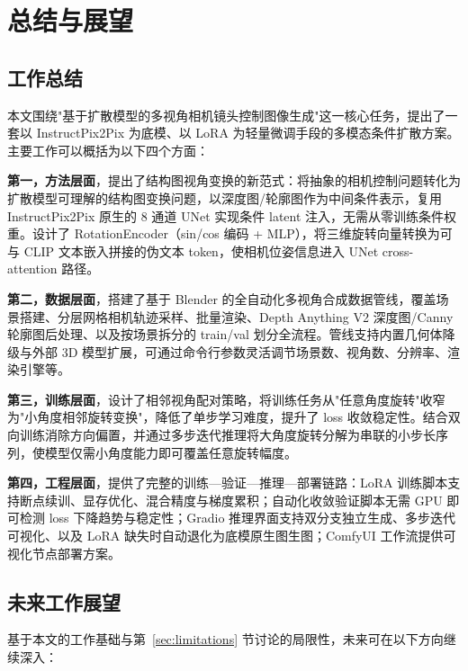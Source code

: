\chapter{总结与展望}

\section{工作总结}

本文围绕"基于扩散模型的多视角相机镜头控制图像生成"这一核心任务，提出了一套以 InstructPix2Pix 为底模、以 LoRA 为轻量微调手段的多模态条件扩散方案。主要工作可以概括为以下四个方面：

\textbf{第一，方法层面}，提出了结构图视角变换的新范式：将抽象的相机控制问题转化为扩散模型可理解的结构图变换问题，以深度图/轮廓图作为中间条件表示，复用 InstructPix2Pix 原生的 8 通道 UNet 实现条件 latent 注入，无需从零训练条件权重。设计了 RotationEncoder（sin/cos 编码 + MLP），将三维旋转向量转换为可与 CLIP 文本嵌入拼接的伪文本 token，使相机位姿信息进入 UNet cross-attention 路径。

\textbf{第二，数据层面}，搭建了基于 Blender 的全自动化多视角合成数据管线，覆盖场景搭建、分层网格相机轨迹采样、批量渲染、Depth Anything V2 深度图/Canny 轮廓图后处理、以及按场景拆分的 train/val 划分全流程。管线支持内置几何体降级与外部 3D 模型扩展，可通过命令行参数灵活调节场景数、视角数、分辨率、渲染引擎等。

\textbf{第三，训练层面}，设计了相邻视角配对策略，将训练任务从"任意角度旋转"收窄为"小角度相邻旋转变换"，降低了单步学习难度，提升了 loss 收敛稳定性。结合双向训练消除方向偏置，并通过多步迭代推理将大角度旋转分解为串联的小步长序列，使模型仅需小角度能力即可覆盖任意旋转幅度。

\textbf{第四，工程层面}，提供了完整的训练—验证—推理—部署链路：LoRA 训练脚本支持断点续训、显存优化、混合精度与梯度累积；自动化收敛验证脚本无需 GPU 即可检测 loss 下降趋势与稳定性；Gradio 推理界面支持双分支独立生成、多步迭代可视化、以及 LoRA 缺失时自动退化为底模原生图生图；ComfyUI 工作流提供可视化节点部署方案。

\section{未来工作展望}

基于本文的工作基础与第~\ref{sec:limitations} 节讨论的局限性，未来可在以下方向继续深入：

